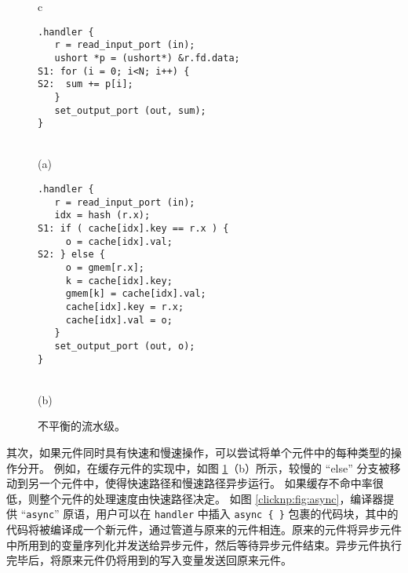 \begin{figure}
\lstset{style=numbers}

\centering

\begin{tabular}{c}
{
\small
\begin{lstlisting}[escapechar=@]
.handler {
   r = read_input_port (in);
   ushort *p = (ushort*) &r.fd.data;
S1: for (i = 0; i<N; i++) {
S2:  sum += p[i];
   }
   set_output_port (out, sum);
}
\end{lstlisting} 
} \\
(a) \vspace{3pt} \\
{
\small 
\begin{lstlisting}[escapechar=@]
.handler {
   r = read_input_port (in);
   idx = hash (r.x);
S1: if ( cache[idx].key == r.x ) {
     o = cache[idx].val;
S2: } else {
     o = gmem[r.x];
     k = cache[idx].key;
     gmem[k] = cache[idx].val;
     cache[idx].key = r.x;
     cache[idx].val = o;
   }
   set_output_port (out, o);
}
\end{lstlisting} 
} \\
(b) \vspace{3pt} 
\end{tabular}

\caption{不平衡的流水级。}
\label{clicknp:fig:unbalance}

\end{figure}


其次，如果元件同时具有快速和慢速操作，可以尝试将单个元件中的每种类型的操作分开。
例如，在缓存元件的实现中，如图 \ref {clicknp:fig:unbalance}（b）所示，较慢的 ``else'' 分支被移动到另一个元件中，使得快速路径和慢速路径异步运行。
如果缓存不命中率很低，则整个元件的处理速度由快速路径决定。
如图 \ref{clicknp:fig:async}，\name 编译器提供 ``\texttt{async}'' 原语，用户可以在 \texttt{handler} 中插入 \texttt{async \{ \}} 包裹的代码块，其中的代码将被编译成一个新元件，通过管道与原来的元件相连。原来的元件将异步元件中所用到的变量序列化并发送给异步元件，然后等待异步元件结束。异步元件执行完毕后，将原来元件仍将用到的写入变量发送回原来元件。




